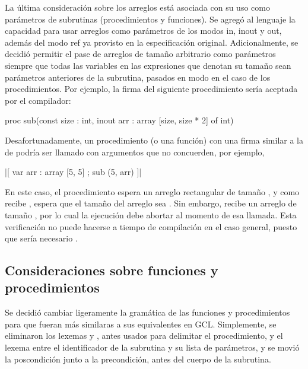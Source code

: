 La última consideración sobre los arreglos está asociada con su uso como
parámetros de subrutinas (procedimientos y funciones). Se agregó al lenguaje la
capacidad para usar arreglos como parámetros de los modos in, inout y out,
además del modo ref ya provisto en la especificación original. Adicionalmente,
se decidió permitir el pase de arreglos de tamaño arbitrario como parámetros
siempre que todas las variables en las expresiones que denotan su tamaño sean
parámetros anteriores de la subrutina, pasados en modo  en el caso
de los procedimientos. Por ejemplo, la firma del siguiente procedimiento sería
aceptada por el compilador:

\begin{gracielacode}
proc sub(const size : int, inout arr : array [size, size * 2] of int)
\end{gracielacode}

Desafortunadamente, un procedimiento (o una función) con una firma similar a la
de  podría ser llamado con argumentos que no concuerden, por
ejemplo,

\begin{gracielacode}
|[ var arr : array [5, 5]
;  sub (5, arr)
]|
\end{gracielacode}

En este caso, el procedimiento  espera un arreglo rectangular de
tamaño , y como recibe , espera que
el tamaño del arreglo sea \ingra{[5, 10]}. Sin embargo, recibe un arreglo de
tamaño \ingra{[5, 5]}, por lo cual la ejecución debe abortar al momento de esa
llamada. Esta verificación no puede hacerse a tiempo de compilación en el caso
general, puesto que sería necesario .

\subsection{Consideraciones sobre funciones y procedimientos}

Se decidió cambiar ligeramente la gramática de las funciones y procedimientos
para que fueran más similaras a sus equivalentes en GCL. Simplemente, se
eliminaron los lexemas  y , antes usados para
delimitar el procedimiento, y el lexema \ingra{:} entre el identificador de la
subrutina y su lista de parámetros, y se movió la poscondición junto a la
precondición, antes del cuerpo de la subrutina.


